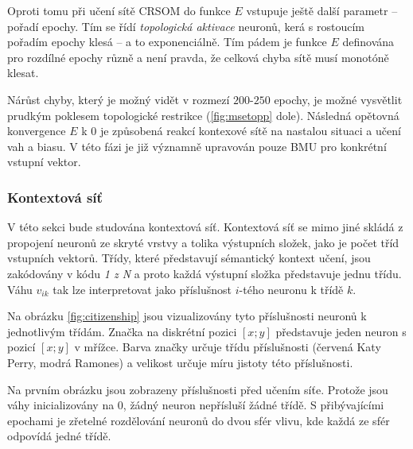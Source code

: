 \documentclass[thesis=M,czech]{FITthesis}[2012/06/26]
\begin{document}
Oproti tomu při učení sítě CRSOM do funkce $E$ vstupuje ještě další parametr -- pořadí epochy. Tím se řídí \textit{topologická aktivace} neuronů, kerá s rostoucím pořadím epochy klesá -- a to exponenciálně. Tím pádem je funkce $E$ definována pro rozdílné epochy různě a není pravda, že celková chyba sítě musí monotóně klesat.


Nárůst chyby, který je možný vidět  v rozmezí $200$-$250$ epochy, je možné vysvětlit prudkým poklesem topologické restrikce (\ref{fig:msetopp} dole). Následná opětovná konvergence $E$ k 0 je způsobená reakcí kontexové sítě na nastalou situaci a učení vah a biasu. V této fázi je již významně upravován pouze BMU pro konkrétní vstupní vektor.



\subsubsection*{Kontextová síť}
V této sekci bude studována kontextová síť. Kontextová síť se mimo jiné skládá z propojení neuronů ze skryté vrstvy a tolika výstupních složek, jako je počet tříd vstupních vektorů. Třídy, které představují sémantický kontext učení, jsou zakódovány v kódu \textit{1 z N} a proto každá výstupní složka představuje jednu třídu. Váhu  $v_{ik}$ tak lze interpretovat jako příslušnost $i$-tého neuronu k třídě $k$. 

Na obrázku \ref{fig:citizenship} jsou vizualizovány tyto příslušnosti neuronů k jednotlivým třídám. Značka na diskrétní pozici $[x;y]$ představuje jeden neuron s pozicí $[x;y]$ v mřížce. Barva značky určuje třídu příslušnosti (červená Katy Perry, modrá Ramones) a velikost určuje míru jistoty této příslušnosti.

Na prvním obrázku jsou zobrazeny příslušnosti před učením síťe. Protože jsou váhy inicializovány na $0$, žádný neuron nepřísluší žádné třídě. S přibývajícími epochami je zřetelné rozdělování neuronů do dvou sfér vlivu, kde každá ze sfér odpovídá jedné třídě. 
\end{document}
